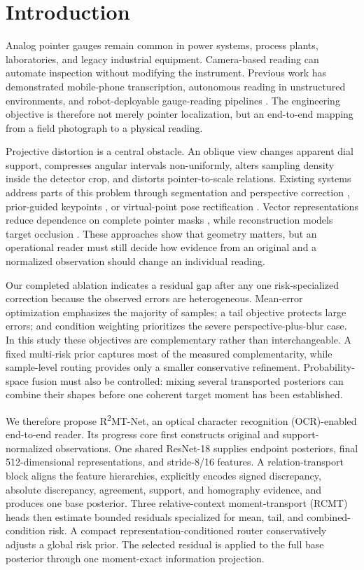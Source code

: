 \documentclass[electronics,article,submit,oneauthor]{Definitions/mdpi}
\newcommand{\modelname}{R\textsuperscript{2}MT-Net}
\begin{document}
\section{Introduction}
\label{sec:introduction}

Analog pointer gauges remain common in power systems, process plants, laboratories, and legacy industrial equipment. Camera-based reading can automate inspection without modifying the instrument. Previous work has demonstrated mobile-phone transcription, autonomous reading in unstructured environments, and robot-deployable gauge-reading pipelines \cite{howells2021analogue,milana2022gauges,reitsma2024underpressure}. The engineering objective is therefore not merely pointer localization, but an end-to-end mapping from a field photograph to a physical reading.

Projective distortion is a central obstacle. An oblique view changes apparent dial support, compresses angular intervals non-uniformly, alters sampling density inside the detector crop, and distorts pointer-to-scale relations. Existing systems address parts of this problem through segmentation and perspective correction \cite{tan2024transunet}, prior-guided keypoints \cite{chu2025prikmet}, or virtual-point pose rectification \cite{lee2026p2yolo}. Vector representations reduce dependence on complete pointer masks \cite{dong2021vdn}, while reconstruction models target occlusion \cite{ninama2026grnet}. These approaches show that geometry matters, but an operational reader must still decide how evidence from an original and a normalized observation should change an individual reading.

Our completed ablation indicates a residual gap after any one risk-specialized correction because the observed errors are heterogeneous. Mean-error optimization emphasizes the majority of samples; a tail objective protects large errors; and condition weighting prioritizes the severe perspective-plus-blur case. In this study these objectives are complementary rather than interchangeable. A fixed multi-risk prior captures most of the measured complementarity, while sample-level routing provides only a smaller conservative refinement. Probability-space fusion must also be controlled: mixing several transported posteriors can combine their shapes before one coherent target moment has been established.

We therefore propose \modelname, an optical character recognition (OCR)-enabled end-to-end reader. Its progress core first constructs original and support-normalized observations. One shared ResNet-18 \cite{he2016resnet} supplies endpoint posteriors, final 512-dimensional representations, and stride-8/16 features. A relation-transport block aligns the feature hierarchies, explicitly encodes signed discrepancy, absolute discrepancy, agreement, support, and homography evidence, and produces one base posterior. Three relative-context moment-transport (RCMT) heads then estimate bounded residuals specialized for mean, tail, and combined-condition risk. A compact representation-conditioned router conservatively adjusts a global risk prior. The selected residual is applied to the full base posterior through one moment-exact information projection.
\end{document}
